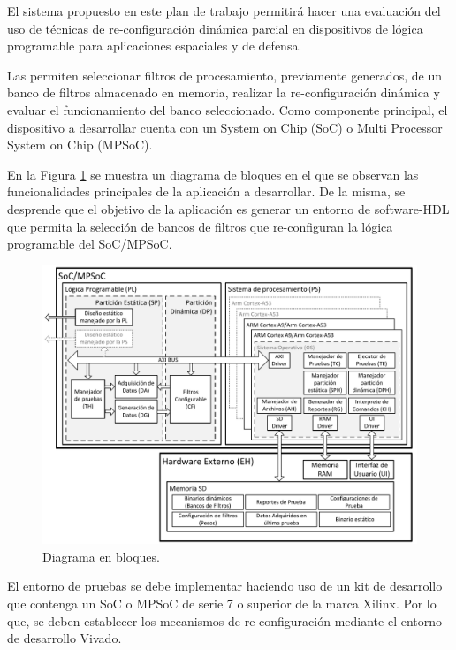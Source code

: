 \documentclass[
11pt, %
]{charter}
\begin{document}
El sistema propuesto en este plan de trabajo permitirá hacer una evaluación del uso de técnicas de re-configuración dinámica parcial en dispositivos de lógica programable para aplicaciones espaciales y de defensa.

Las \ttitle permiten seleccionar filtros de procesamiento, previamente generados, de un banco de filtros almacenado en memoria, realizar la re-configuración dinámica y evaluar el funcionamiento del banco seleccionado. Como componente principal, el dispositivo a desarrollar cuenta con un System on Chip (SoC) o Multi Processor System on Chip (MPSoC).

En la Figura \ref{fig:diagBloques} se muestra un diagrama de bloques en el que se observan las funcionalidades principales de la aplicación a desarrollar. De la misma, se desprende que el objetivo de la aplicación es generar un entorno de software-HDL que permita la selección de bancos de filtros que re-configuran la lógica programable del SoC/MPSoC.

\begin{figure}[h]
\raggedleft
\includegraphics[width=1.05\textwidth]{./Figuras/DiagamaCPR_grande.pdf}
\caption{Diagrama en bloques.}
\label{fig:diagBloques}
\end{figure}

El entorno de pruebas se debe implementar haciendo uso de un kit de desarrollo que contenga un SoC o MPSoC de serie 7 o superior de la marca Xilinx. Por lo que, se deben establecer los mecanismos de re-configuración mediante el entorno de desarrollo Vivado.
\end{document}
